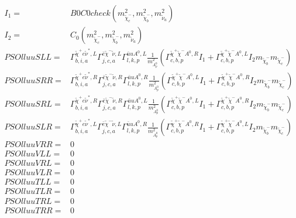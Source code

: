 \documentclass[A4,landscape]{article}
\begin{document}
\begin{align} 
I_1= & B0C0check(m^2_{\tilde{\chi}^-_{{c}}}, m^2_{\tilde{\chi}^-_{{b}}}, m^2_{\tilde{\nu}_{{a}}}) \\ 
I_2= & C_0(m^2_{\tilde{\chi}^-_{{c}}}, m^2_{\tilde{\chi}^-_{{b}}}, m^2_{\tilde{\nu}_{{a}}}) \\ 
  PSOlluuSLL= &  \Gamma^{\tilde{\chi}^+e \tilde{\nu}^*,L}_{b, i, a} \Gamma^{\bar{e}\tilde{\chi}^- \tilde{\nu} ,L}_{j, c, a} \Gamma^{\bar{u}u A^0 ,L}_{l, k, p} \frac{1}{m^2_{A^0_{{p}}}} (\Gamma^{\tilde{\chi}^+\tilde{\chi}^- A^0 ,R}_{c, b, p} I_1 + \Gamma^{\tilde{\chi}^+\tilde{\chi}^- A^0 ,L}_{c, b, p} I_2 m_{\tilde{\chi}^-_{{b}}} m_{\tilde{\chi}^-_{{c}}}) \\ 
  PSOlluuSRR= &  \Gamma^{\tilde{\chi}^+e \tilde{\nu}^*,R}_{b, i, a} \Gamma^{\bar{e}\tilde{\chi}^- \tilde{\nu} ,R}_{j, c, a} \Gamma^{\bar{u}u A^0 ,R}_{l, k, p} \frac{1}{m^2_{A^0_{{p}}}} (\Gamma^{\tilde{\chi}^+\tilde{\chi}^- A^0 ,L}_{c, b, p} I_1 + \Gamma^{\tilde{\chi}^+\tilde{\chi}^- A^0 ,R}_{c, b, p} I_2 m_{\tilde{\chi}^-_{{b}}} m_{\tilde{\chi}^-_{{c}}}) \\ 
  PSOlluuSRL= &  \Gamma^{\tilde{\chi}^+e \tilde{\nu}^*,R}_{b, i, a} \Gamma^{\bar{e}\tilde{\chi}^- \tilde{\nu} ,R}_{j, c, a} \Gamma^{\bar{u}u A^0 ,L}_{l, k, p} \frac{1}{m^2_{A^0_{{p}}}} (\Gamma^{\tilde{\chi}^+\tilde{\chi}^- A^0 ,L}_{c, b, p} I_1 + \Gamma^{\tilde{\chi}^+\tilde{\chi}^- A^0 ,R}_{c, b, p} I_2 m_{\tilde{\chi}^-_{{b}}} m_{\tilde{\chi}^-_{{c}}}) \\ 
  PSOlluuSLR= &  \Gamma^{\tilde{\chi}^+e \tilde{\nu}^*,L}_{b, i, a} \Gamma^{\bar{e}\tilde{\chi}^- \tilde{\nu} ,L}_{j, c, a} \Gamma^{\bar{u}u A^0 ,R}_{l, k, p} \frac{1}{m^2_{A^0_{{p}}}} (\Gamma^{\tilde{\chi}^+\tilde{\chi}^- A^0 ,R}_{c, b, p} I_1 + \Gamma^{\tilde{\chi}^+\tilde{\chi}^- A^0 ,L}_{c, b, p} I_2 m_{\tilde{\chi}^-_{{b}}} m_{\tilde{\chi}^-_{{c}}}) \\ 
  PSOlluuVRR= & 0 \\ 
  PSOlluuVLL= & 0 \\ 
  PSOlluuVRL= & 0 \\ 
  PSOlluuVLR= & 0 \\ 
  PSOlluuTLL= & 0 \\ 
  PSOlluuTLR= & 0 \\ 
  PSOlluuTRL= & 0 \\ 
  PSOlluuTRR= & 0 \\ 
\end{align} 
\end{document}
